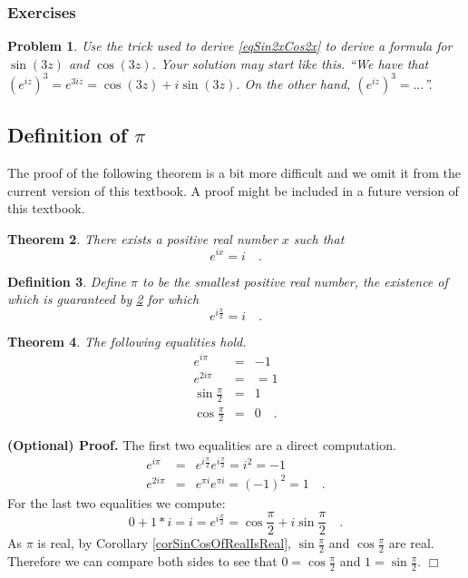 \documentclass[12pt]{book}
\newenvironment{proofOptional}[1][]{ \noindent \textbf{(Optional) Proof#1.}}{$\Box$\medskip}
\newtheorem{theorem}{Theorem}[section]
\newtheorem{definition}[theorem]{Definition}
\newtheorem{problem}[theorem]{Problem}
\begin{document}
\subsubsection{Exercises}
\begin{problem}
Use the trick used to derive \eqref{eqSin2xCos2x} to derive a formula for $\sin(3z)$ and $\cos (3z)$. Your solution may start like this. ``We have that $(e^{iz})^3=e^{3iz}=\cos (3z)+i\sin(3z)$. On the other hand, $(e^{iz})^3= \dots$''.
\end{problem}
\subsection{Definition of $\pi$}
\label{secDefinitionPi}

The proof of the following theorem is a bit more difficult and we omit it from the current version of this textbook. A proof might be included in a future version of this textbook.
\begin{theorem}\label{thPiExists}
There exists a positive real number $x$ such that \index{$\pi$}
\begin{equation}\boxed{
e^{ix}=i\quad .
}
\end{equation}
\end{theorem}

\begin{definition}
Define $\pi$ to be the smallest positive real number, the existence of which is guaranteed by \ref{thPiExists} for which
\begin{equation}\boxed{
e^{i\frac{\pi}{2} }= i\quad .
}
\end{equation}
\end{definition}



\begin{theorem} The following equalities hold.
\begin{equation}\label{eqe^ipi}
\begin{array}{rcl}
\displaystyle e^{i\pi}&=&-1\\
\displaystyle e^{2i\pi}&=&=1\\
\displaystyle \sin \frac{\pi}2 &=& 1\\
\displaystyle \cos \frac{\pi}2 &=& 0\quad .
\end{array}
\end{equation}
\end{theorem}
\begin{proofOptional}
The first two equalities are a direct computation.
\[
\begin{array}{rcl}
\displaystyle e^{i\pi}&=&\displaystyle  e^{i\frac{\pi}2}e^{i\frac{\pi}2}= i^2= -1\\
\displaystyle e^{2i\pi}&=&\displaystyle  e^{\pi i} e^{\pi i}= (-1)^2=1\quad .
\end{array}
\]
For the last two equalities we compute:
\[
0+ 1*i=i=e^{i\frac{\pi}2}= \cos \frac{\pi}2 + i\sin \frac\pi 2\quad .
\]
As $\pi$ is real, by Corollary \ref{corSinCosOfRealIsReal}, $\sin\frac{\pi}{2}$ and $\cos \frac{\pi}{2}$ are real. Therefore we can compare both sides to see that $0=\cos \frac{\pi}{2}$ and $1=\sin \frac \pi 2$.
\end{proofOptional}
\end{document}
